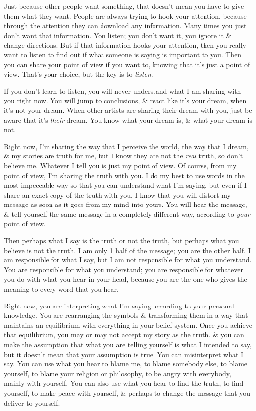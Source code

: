 \documentclass{article}
\numberwithin{equation}{section}
\begin{document}
Just because other people want something, that doesn't mean you have to give them what they want. People are always trying to hook your attention, because through the attention they can download any information. Many times you just don't want that information. You listen; you don't want it, you ignore it \& change directions. But if that information hooks your attention, then you really want to listen to find out if what someone is saying is important to you. Then you can share your point of view if you want to, knowing that it's just a point of view. That's your choice, but the key is to \textit{listen}.

If you don't learn to listen, you will never understand what I am sharing with you right now. You will jump to conclusions, \& react like it's your dream, when it's not your dream. When other artists are sharing their dream with you, just be aware that it's \textit{their} dream. You know what your dream is, \& what your dream is not.

Right now, I'm sharing the way that I perceive the world, the way that I dream, \& my stories are truth for me, but I know they are not the \textit{real} truth, so don't believe me. Whatever I tell you is just my point of view. Of course, from my point of view, I'm sharing the truth with you. I do my best to use words in the most impeccable way so that you can understand what I'm saying, but even if I share an exact copy of the truth with you, I know that you will distort my message as soon as it goes from my mind into yours. You will hear the message, \& tell yourself the same message in a completely different way, according to \textit{your} point of view.

Then perhaps what I say is the truth or not the truth, but perhaps what you believe is not the truth. I am only 1 half of the message; you are the other half. I am responsible for what I say, but I am not responsible for what you understand. You are responsible for what you understand; you are responsible for whatever you do with what you hear in your head, because you are the one who gives the meaning to every word that you hear.

Right now, you are interpreting what I'm saying according to your personal knowledge. You are rearranging the symbols \& transforming them in a way that maintains an equilibrium with everything in your belief system. Once you achieve that equilibrium, you may or may not accept my story as the truth. \& you can make the assumption that what you are telling yourself is what I intended to say, but it doesn't mean that your assumption is true. You can misinterpret what I say. You can use what you hear to blame me, to blame somebody else, to blame yourself, to blame your religion or philosophy, to be angry with everybody, mainly with yourself. You can also use what you hear to find the truth, to find yourself, to make peace with yourself, \& perhaps to change the message that you deliver to yourself.
\end{document}
